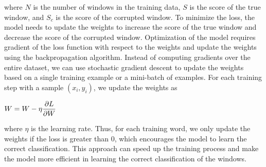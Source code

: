 \documentclass[12pt]{article}
\begin{document}
\begin{description}
  where $N$ is the number of windows in the training data, $S$ is the score of the true window, and $S_c$ is the score of the corrupted window. To minimize the loss, the model
  needs to update the weights to increase the score of the true window and decrease the score of the corrupted window. Optimization of the model requires gradient of the loss 
  function with respect to the weights and update the weights using the backpropagation algorithm. Instead of computing gradients over the entire dataset, we can use stochastic
  gradient descent to update the weights based on a single training example or a mini-batch of examples. For each training step with a sample $(x_i, y_i)$, we update the weights
  as

  \begin{center}
    $\displaystyle{W = W - \eta \pdv{L}{W}}$
  \end{center}

  where $\eta$ is the learning rate. Thus, for each training word, we only update the weights if the loss is greater than 0, which encourages the model to learn the correct 
  classification. This approach can speed up the training process and make the model more efficient in learning the correct classification of the windows. 

  \pagebreak
  
\end{description}
\end{document}
